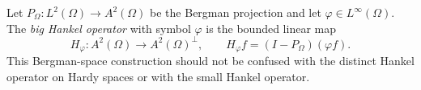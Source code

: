 
Let $P_\Omega:L^2(\Omega)\to A^2(\Omega)$ be the Bergman projection and let $\varphi\in L^\infty(\Omega)$. The \emph{big Hankel operator} with symbol $\varphi$ is the bounded linear map
\[
H_\varphi:A^2(\Omega)\to A^2(\Omega)^\perp,\qquad
H_\varphi f=(I-P_\Omega)(\varphi f).
\]
This Bergman-space construction should not be confused with the distinct Hankel operator on Hardy spaces or with the small Hankel operator.
